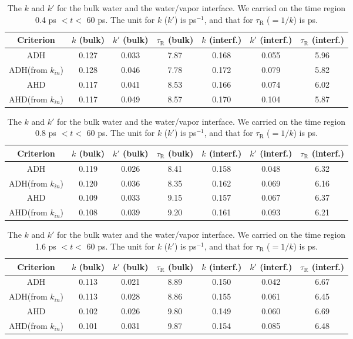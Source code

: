 \begin{table}[htbp]
\centering
\caption{\label{tab:k_k_prime_128w_pure_2} 
    The $k$ and $k'$ for the bulk water and the water/vapor interface. We carried on the time region 0.4 ps $< t <$ 60 ps. 
The unit for $k$ ($k'$) is ps$^{-1}$, and that for $\tau_{\text{R}}$ ($=1/k$) is ps.} 
\begin{tabular}{ccccccc}
 Criterion & $k$  (bulk) & $k'$ (bulk) & $\tau_{\text{R}}$ (bulk) & $k$  (interf.) & $k'$ (interf.) & $\tau_{\text{R}}$ (interf.)\\
\hline
  ADH & 0.127 & 0.033 & 7.87 & 0.168 & 0.055 & 5.96 \\
  ADH(from $k_{in}$) & 0.128  & 0.046 & 7.78 & 0.172  & 0.079 & 5.82\\
  AHD & 0.117 & 0.041 & 8.53  & 0.166 & 0.074 & 6.02 \\
  AHD(from $k_{in}$) & 0.117  & 0.049 & 8.57 & 0.170  & 0.104 & 5.87 \\
\end{tabular}
\end{table}


\begin{table}[htbp]
\centering
\caption{\label{tab:k_k_prime_128w_pure_3} 
    The $k$ and $k'$ for the bulk water and the water/vapor interface. We carried on the time region 0.8 ps $< t <$ 60 ps. 
The unit for $k$ ($k'$) is ps$^{-1}$, and that for $\tau_{\text{R}}$ ($=1/k$) is ps.} 
\begin{tabular}{ccccccc}
 Criterion & $k$  (bulk) & $k'$ (bulk) & $\tau_{\text{R}}$ (bulk) & $k$  (interf.) & $k'$ (interf.) & $\tau_{\text{R}}$ (interf.)\\
\hline
  ADH & 0.119 & 0.026 & 8.41 & 0.158 & 0.048 & 6.32 \\
  ADH(from $k_{in}$) & 0.120  & 0.036 & 8.35 & 0.162  & 0.069 & 6.16 \\
  AHD & 0.109 & 0.033 & 9.15 & 0.157 & 0.067 & 6.37 \\
  AHD(from $k_{in}$) & 0.108  & 0.039 & 9.20 & 0.161  & 0.093 & 6.21 \\
\end{tabular}
\end{table}

\begin{table}[htbp]
\centering
\caption{\label{tab:k_k_prime_128w_pure_4} 
    The $k$ and $k'$ for the bulk water and the water/vapor interface. We carried on the time region 1.6 ps $< t <$ 60 ps. 
The unit for $k$ ($k'$) is ps$^{-1}$, and that for $\tau_{\text{R}}$ ($=1/k$) is ps.} 
\begin{tabular}{ccccccc}
 Criterion & $k$  (bulk) & $k'$ (bulk) & $\tau_{\text{R}}$ (bulk) & $k$  (interf.) & $k'$ (interf.) & $\tau_{\text{R}}$ (interf.)\\
\hline
  ADH & 0.113 & 0.021 & 8.89  & 0.150 & 0.042 & 6.67\\
  ADH(from $k_{in}$) & 0.113  & 0.028 & 8.86  & 0.155  & 0.061 & 6.45 \\
  AHD & 0.102 & 0.026 & 9.80 & 0.149 & 0.060 & 6.69\\
  AHD(from $k_{in}$) & 0.101  & 0.031 & 9.87 & 0.154  & 0.085 & 6.48 \\
\end{tabular}
\end{table}

